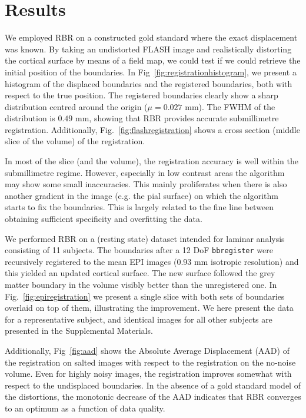 \section{Results}
We employed RBR on a constructed gold standard where the exact displacement was known. By taking an undistorted FLASH image and realistically distorting the cortical surface by means of a field map, we could test if we could retrieve the initial position of the boundaries. In Fig~\ref{fig:registrationhistogram}, we present a histogram of the displaced boundaries and the registered boundaries, both with respect to the true position. The registered boundaries clearly show a sharp distribution centred around the origin ($\mu=0.027$ mm). The FWHM of the distribution is $0.49$ mm, showing that RBR provides accurate submillimetre registration. Additionally, Fig.~\ref{fig:flashregistration} shows a cross section (middle slice of the volume) of the registration.



In most of the slice (and the volume), the registration accuracy is well within the submillimetre regime. However, especially in low contrast areas the algorithm may show some small inaccuracies. This mainly proliferates when there is also another gradient in the image (e.g. the pial surface) on which the algorithm starts to fix the boundaries. This is largely related to the fine line between obtaining sufficient specificity and overfitting the data.

We performed RBR on a (resting state) dataset intended for laminar analysis consisting of 11 subjects. The boundaries after a 12 DoF \texttt{bbregister} were recursively registered to the mean EPI images (0.93 mm isotropic resolution) and this yielded an updated cortical surface. The new surface followed the grey matter boundary in the volume visibly better than the unregistered one. In Fig.~\ref{fig:epiregistration} we present a single slice with both sets of boundaries overlaid on top of them, illustrating the improvement. We here present the data for a representative subject, and identical images for all other subjects are presented in the Supplemental Materials.


Additionally, Fig~\ref{fig:aad} shows the Absolute Average Displacement (AAD) of the registration on salted images with respect to the registration on the no-noise volume. Even for highly noisy images, the registration improves somewhat with respect to the undisplaced boundaries. In the absence of a gold standard model of the distortions, the monotonic decrease of the AAD indicates that RBR converges to an optimum as a function of data quality.


